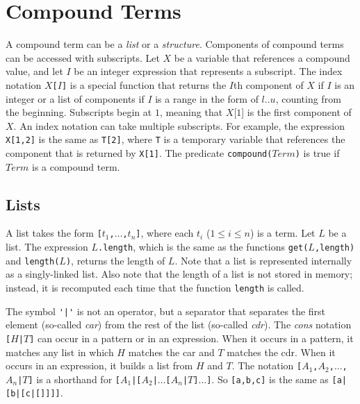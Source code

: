 \section{Compound Terms}
A compound term can be a \emph{list} or a \emph{structure}. Components of compound terms can be accessed with subscripts. Let $X$ be a variable that references a compound value, and let $I$ be an integer expression that represents a subscript. The index notation \texttt{$X$[$I$]} is a special function that returns the $I$th component of $X$ if $I$ is an integer or a list of components if $I$ is a range in the form of $l..u$, counting from the beginning. Subscripts begin at $1$, meaning that $X$[$1$] is the first component of $X$. An index notation can take multiple subscripts. For example, the expression \texttt{X[1,2]} is the same as \texttt{T[2]}, where \texttt{T} is a temporary variable that references the component that is returned by \texttt{X[1]}. The predicate \texttt{compound($Term$)} is true if $Term$ is a compound term.

\subsection{\label{subsec:lists}Lists}
A list takes the form \texttt{[$t_1$,$\ldots$,$t_{n}$]}, where each $t_i$ ($1\le i \le n$) is a term. Let $L$ be a list. The expression \texttt{$L$.length}, which is the same as the functions \texttt{get($L$,length)} and \texttt{length($L$)}, returns the length of $L$. Note that a list is represented internally as a singly-linked list.  Also note that the length of a list is not stored in memory; instead, it is recomputed each time that the function \texttt{length} is called.

The symbol \verb+'|'+ is not an operator, but a separator that separates the first element (so-called \emph{car}) from the rest of the list (so-called \emph{cdr}). The \emph{cons} notation {\tt [$H$\verb+|+$T$]} can occur in a pattern or in an expression. When it occurs in a pattern, it matches any list in which $H$ matches the car and $T$ matches the cdr. When it occurs in an expression, it builds a list from $H$ and $T$. The notation {\tt [$A_1$,$A_2$,$\ldots$,$A_n$\verb+|+$T$]} is a shorthand for {\tt [$A_1$\verb+|+[$A_2$\verb+|+$\ldots$[$A_n$\verb+|+$T$]$\ldots$]}. So \texttt{[a,b,c]} is the same as \texttt{[a|[b|[c|[]]]]}.


